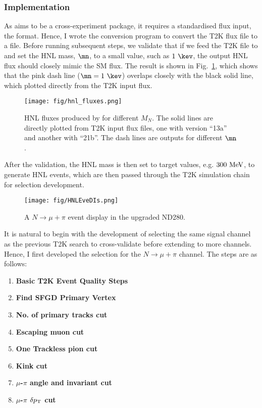     \subsubsection{Implementation}
        As  aims to be a cross-experiment package, it requires a standardised flux input, the  format. Hence, I wrote the conversion program to convert the T2K flux file to a  file. Before running subsequent steps, we validate that if we feed the T2K  file to  and set the HNL mass, $\mn$, to a small value, such as $1~\kev$, the output HNL flux should closely mimic the SM flux. The result is shown in Fig.~\ref{fig:hnl-fluxes}, which shows that the pink dash line ($\mn=1~\kev$) overlaps closely with the black solid line, which plotted directly from the T2K input flux.  
        \begin{figure}[!htb] 
            \centering 		
            \texttt{[image: fig/hnl\_fluxes.png]}
            \caption{\label{fig:hnl-fluxes} HNL fluxes produced by  for different $M_N$. The solid lines are directly plotted from T2K input flux files, one with version ``13a'' and another with ``21b''. The dash lines are  outputs for different $\mn$.} 
        \end{figure}
        After the validation, the HNL mass is then set to target values, e.g. $300~\textrm{MeV}$, to generate HNL events, which are then passed through the T2K simulation chain for selection development. 
        \begin{figure}[!htb] 
            \centering 		
            \texttt{[image: fig/HNLEveDIs.png]}
            \caption{\label{fig:hnl-evedis} A $N\rightarrow\mu+\pi$ event display in the upgraded ND280.} 
        \end{figure}

        It is natural to begin with the development of selecting the same signal channel as the previous T2K search to cross-validate before extending to more channels. Hence, I first developed the selection for the $N\rightarrow\mu+\pi$ channel. The steps are as follows:

        \begin{enumerate}
            \item \textbf{Basic T2K Event Quality Steps} 
            \item \textbf{Find SFGD Primary Vertex} 
            \item \textbf{No. of primary tracks cut} 
            \item \textbf{Escaping muon cut} 
            \item \textbf{One Trackless pion cut}
            \item \textbf{Kink cut}
            \item \textbf{$\mu$-$\pi$ angle and invariant cut}
            \item \textbf{$\mu$-$\pi$ $\delta p_\textrm{T}$ cut}
        \end{enumerate}

